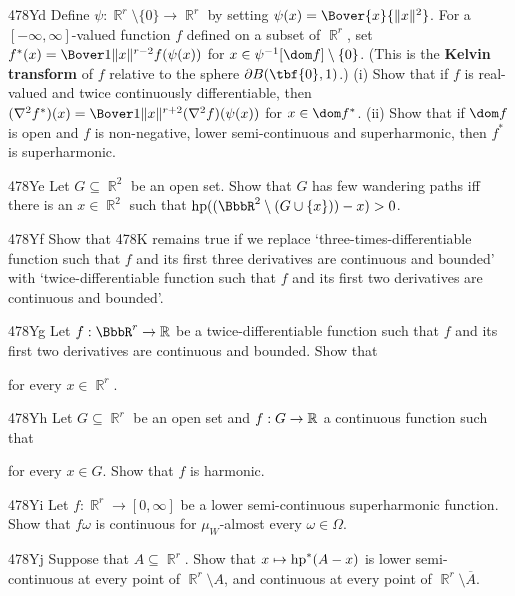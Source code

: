 {\spheader 478Yd Define $\psi:\BbbR^r\setminus\{0\}\to\BbbR^r$ by setting
$\psi(x)=\Bover{x}{\|x\|^2}$.
For a $[-\infty,\infty]$-valued function $f$ defined on a subset of
$\BbbR^r$, set $f^*(x)=\Bover1{\|x\|^{r-2}}f(\psi(x))$ for
$x\in\psi^{-1}[\dom f]\setminus\{0\}$.
(This is the {\bf Kelvin transform} of $f$ relative
to the sphere $\partial B(\tbf{0},1)$.)   (i) Show that if $f$ is real-valued
and twice continuously differentiable, then
$(\nabla^2f^*)(x)=\Bover1{\|x\|^{r+2}}(\nabla^2f)(\psi(x))$
for $x\in\dom f^*$.
(ii) Show that if $\dom f$ is open and $f$ is non-negative,
lower semi-continuous and superharmonic, then $f^*$ is
superharmonic.  %

\spheader 478Ye Let $G\subseteq\BbbR^2$ be an open set.   Show that $G$ has
few wandering paths iff there is an $x\in\BbbR^2$ such that
$\hp((\BbbR^2\setminus(G\cup\{x\}))-x)>0$.

\spheader 478Yf Show that 478K remains true if we replace
`three-times-differentiable function such that $f$ and its first three
derivatives are continuous and bounded' with
`twice-differentiable function such that $f$ and its first two
derivatives are continuous and bounded'.

\spheader 478Yg Let $f:\BbbR^r\to\Bbb R$ be a twice-differentiable
function such that $f$ and its first two
derivatives are continuous and bounded.   Show that


\noindent for every $x\in\BbbR^r$.

\spheader 478Yh Let $G\subseteq\BbbR^r$ be an open set and $f:G\to\Bbb R$ a
continuous function such that


\noindent for every $x\in G$.   Show that $f$ is harmonic.

\spheader 478Yi Let $f:\BbbR^r\to[0,\infty]$ be a lower semi-continuous
superharmonic function.   Show
that $f\omega$ is continuous for $\mu_W$-almost every $\omega\in\Omega$.

\spheader 478Yj Suppose that $A\subseteq\BbbR^r$.
Show that $x\mapsto\mathop{\text{hp}}\nolimits^*(A-x)$ is lower
semi-continuous at every point of $\BbbR^r\setminus A$, and continuous at
every point of $\BbbR^r\setminus\overline{A}$.

}
